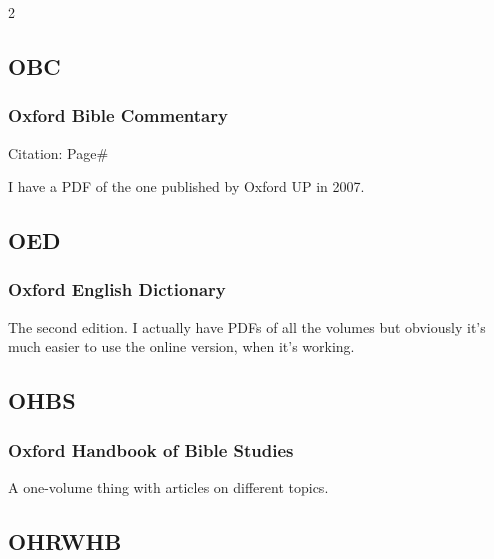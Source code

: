 \begin{multicols}{2}
			\phantom{.}
				
	\subsection*{OBC}
	
		\subsubsection*{Oxford Bible Commentary}
		
			Citation:
				Page\#
				
			I have a PDF of the one published by Oxford UP in 2007.
			
	\subsection*{OED}
	
		\subsubsection*{Oxford English Dictionary}
		
			The second edition. I actually have PDFs of all the volumes but obviously it's much easier to use the online version, when it's working.
			
	\subsection*{OHBS}
	
		\subsubsection*{Oxford Handbook of Bible Studies}
		
			A one-volume thing with articles on different topics.
			
	\subsection*{OHRWHB}
	

\end{multicols}
